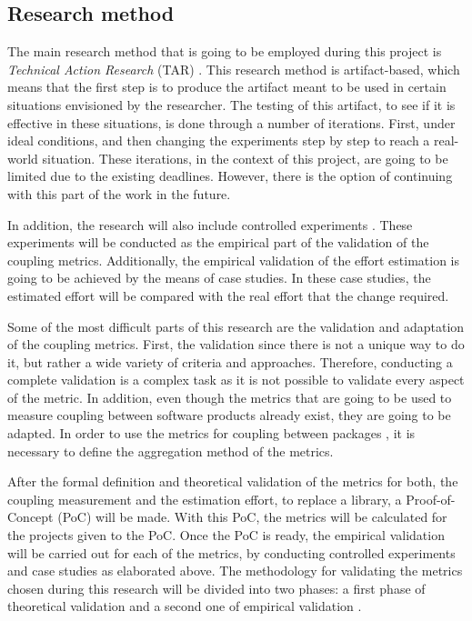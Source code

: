 \subsection{Research method}
The main research method that is going to be employed during this project is \textit{Technical Action Research} (TAR) \cite{wieringa2012technical}.
This research method is artifact-based, which means that the first step is to produce the artifact meant to be used in certain situations envisioned by the researcher. The testing of this artifact, to see if it is effective in these situations, is done through a number of iterations. First, under ideal conditions, and then changing the experiments step by step to reach a real-world situation. These iterations, in the context of this project, are going to be limited due to the existing deadlines. However, there is the option of continuing with this part of the work in the future.

\blankl
In addition, the research will also include controlled experiments . These experiments will be conducted as the empirical part of the validation of the coupling metrics. Additionally, the empirical validation of the effort estimation is going to be achieved by the means of case studies. In these case studies, the estimated effort will be compared with the real effort that the change required. 

\blankl
Some of the most difficult parts of this research  are the validation and adaptation  of the coupling metrics.
First, the validation since there is not a unique way to do it, but rather a wide variety of criteria and approaches. Therefore, conducting a complete validation is a complex task as it is not possible to validate every aspect of the metric.
In addition, even though the metrics that are going to be used to measure coupling between software products already exist, they are going to be adapted. In order to use the metrics for coupling between packages , it is necessary to define the aggregation method of the metrics.

\blankl
After the formal definition and theoretical validation of the metrics for both, the coupling measurement and the estimation effort, to replace a library, a Proof-of-Concept (PoC) will be made. With this PoC, the metrics will be calculated for the projects given to the PoC. Once the PoC is ready, the empirical validation will be carried out for each of the metrics, by conducting controlled experiments and case studies as elaborated above.
The methodology for validating the metrics chosen during this research will be divided into two phases: a first phase of theoretical validation and a second one of empirical validation \cite{srinivasan2014software}. 

